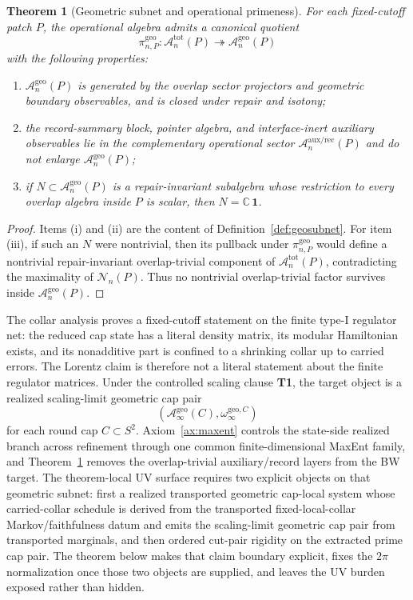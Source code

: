 \documentclass[11pt]{article}
\newtheorem{theorem}{Theorem}[section]
\begin{document}
\begin{theorem}[Geometric subnet and operational primeness]\label{thm:geosubnet}
For each fixed-cutoff patch \(P\), the operational algebra admits a canonical quotient
\[
\pi_{n,P}^{\mathrm{geo}}:\mathcal A_n^{\mathrm{tot}}(P)\twoheadrightarrow \mathcal A_n^{\mathrm{geo}}(P)
\]
with the following properties:
\begin{enumerate}[label=\textup{(\roman*)},leftmargin=2em]
\item \(\mathcal A_n^{\mathrm{geo}}(P)\) is generated by the overlap sector projectors and geometric boundary observables, and is closed under repair and isotony;
\item the record-summary block, pointer algebra, and interface-inert auxiliary observables lie in the complementary operational sector \(\mathcal A_n^{\mathrm{aux/rec}}(P)\) and do not enlarge \(\mathcal A_n^{\mathrm{geo}}(P)\);
\item if \(N\subset \mathcal A_n^{\mathrm{geo}}(P)\) is a repair-invariant subalgebra whose restriction to every overlap algebra inside \(P\) is scalar, then \(N=\mathbb C\,\mathbf 1\).
\end{enumerate}
\end{theorem}

\begin{proof}
Items \textup{(i)} and \textup{(ii)} are the content of Definition~\ref{def:geosubnet}. For item \textup{(iii)}, if such an \(N\) were nontrivial, then its pullback under \(\pi_{n,P}^{\mathrm{geo}}\) would define a nontrivial repair-invariant overlap-trivial component of \(\mathcal A_n^{\mathrm{tot}}(P)\), contradicting the maximality of \(\mathcal N_n(P)\). Thus no nontrivial overlap-trivial factor survives inside \(\mathcal A_n^{\mathrm{geo}}(P)\).
\end{proof}

The collar analysis proves a fixed-cutoff statement on the finite type-I regulator net: the reduced cap state has a literal density matrix, its modular Hamiltonian exists, and its nonadditive part is confined to a shrinking collar up to carried errors. The Lorentz claim is therefore not a literal statement about the finite regulator matrices. Under the controlled scaling clause \textbf{T1}, the target object is a realized scaling-limit geometric cap pair
\[
(\mathcal A_\infty^{\mathrm{geo}}(C),\omega_\infty^{\mathrm{geo},C})
\]
for each round cap \(C\subset S^2\). Axiom~\ref{ax:maxent} controls the state-side realized branch across refinement through one common finite-dimensional MaxEnt family, and Theorem~\ref{thm:geosubnet} removes the overlap-trivial auxiliary/record layers from the BW target. The theorem-local UV surface requires two explicit objects on that geometric subnet: first a realized transported geometric cap-local system whose carried-collar schedule is derived from the transported fixed-local-collar Markov/faithfulness datum and emits the scaling-limit geometric cap pair from transported marginals, and then ordered cut-pair rigidity on the extracted prime cap pair. The theorem below makes that claim boundary explicit, fixes the \(2\pi\) normalization once those two objects are supplied, and leaves the UV burden exposed rather than hidden.
\end{document}
